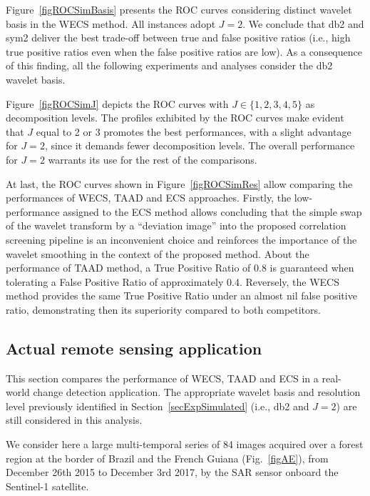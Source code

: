 \documentclass[journal]{IEEEtran}
\begin{document}
Figure~\ref{figROCSimBasis} presents the ROC curves considering distinct wavelet basis in the WECS method. All instances adopt $J=2$. We conclude that db2 and sym2 deliver the best trade-off between true and false positive ratios (i.e., high true positive ratios even when the false positive ratios are low).
As a consequence of this finding, all the following experiments and analyses consider the db2 wavelet basis.

Figure~\ref{figROCSimJ} depicts the ROC curves with $J \in \{1,2,3,4,5\}$ as decomposition levels. The profiles exhibited by the ROC curves make evident that $J$ equal to 2 or 3 promotes the best performances, with a slight advantage for $J=2$, since it demands fewer decomposition levels. The overall performance for $J=2$ warrants its use for the rest of the comparisons.

At last, the ROC curves shown in Figure~\ref{figROCSimRes} allow comparing the performances of WECS, TAAD and ECS approaches. 
Firstly, the low-performance assigned to the ECS method allows concluding that the simple swap of the wavelet transform by a ``deviation image'' into the proposed correlation screening pipeline is an inconvenient choice and reinforces the importance of the wavelet smoothing in the context of the proposed method.
About the performance of TAAD method, a True Positive Ratio of 0.8 is guaranteed when tolerating a False Positive Ratio of approximately 0.4. 
Reversely, the WECS method provides the same True Positive Ratio under an almost nil false positive ratio, demonstrating then its superiority compared to both competitors.


\subsection{Actual remote sensing application}\label{secExpActual}


This section compares the performance of WECS, TAAD and ECS in a real-world change detection application. The appropriate wavelet basis and resolution level previously identified in Section~\ref{secExpSimulated} (i.e., db2 and $J=2$) are still considered in this analysis.

We consider here a large multi-temporal series of 84 images acquired over a forest region at the border of Brazil and the French Guiana (Fig.~\ref{figAE}), from December 26th 2015 to December 3rd 2017, by the SAR sensor onboard the Sentinel-1 satellite.
\end{document}
